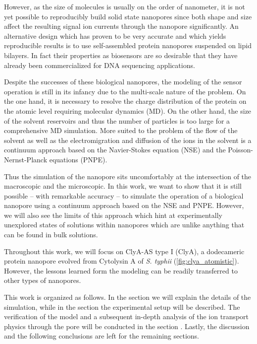 \documentclass[journal=ancac3, manuscript=article, etalmode=truncate,maxauthors=0]{achemso}
\begin{document}
However, as the size of molecules is usually on the order of nanometer, it is not yet possible to reproducibly
build solid state nanopores\cite{} since both shape and size affect the resulting signal ion currents through
the nanopore significantly. An alternative design which has proven to be very accurate and which yields
reproducible results is to use self-assembled protein nanopores suspended on lipid bilayers\cite{deam2016}.
In fact their properties as biosensors are so desirable that they have already been commercialized for DNA
sequencing applications\cite{}. 

Despite the successes of these biological nanopores, the modeling of the sensor operation is still
in its infancy due to the multi-scale nature of the problem. On the one hand, it is necessary to
resolve the charge distribution of the protein on the atomic level requiring molecular dynamics
(MD).\cite{}  On the other hand, the size of the solvent reservoirs and thus the number of
particles is too large for a comprehensive MD simulation. More suited to the problem of the
flow of the solvent as well as the electromigration and diffusion of the ions in the solvent is a
continuum approach based on the Navier-Stokes equation (NSE) and the Poisson-Nernst-Planck equations
(PNPE).\cite{}

Thus the simulation of the nanopore sits uncomfortably at the intersection of the macroscopic and the
microscopic. In this work, we want to show that it is still possible -- with remarkable accuracy --
to simulate the operation of a biological nanopore using a continuum approach based on the NSE and
PNPE. However, we will also see the limits of this approach which hint at experimentally unexplored states of
solutions within nanopores which are unlike anything that can be found in bulk solutions.

Throughout this work, we will focus on ClyA-AS type I (ClyA), a dodecameric protein nanopore evolved from
Cytolysin A of \textit{S. typhii} (\cref{fig:clya_atomistic}).\cite{soskine2013} However, the lessons learned
form the modeling can be readily transferred to other types of nanopores.

This work is organized as follows. In the section \emph{} we will explain the
details of the simulation, while in the section \emph{} the experimental setup will
be described. The verification of the model and a subsequent in-depth analysis of the ion transport physics
through the pore will be conducted in the section \emph{}. Lastly, the discussion and
the following conclusions are left for the remaining sections.
\end{document}
